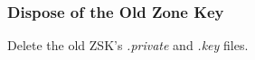 
\subsubsection{Dispose of the Old Zone Key}

Delete the old ZSK's {\it .private} and {\it .key} files.
